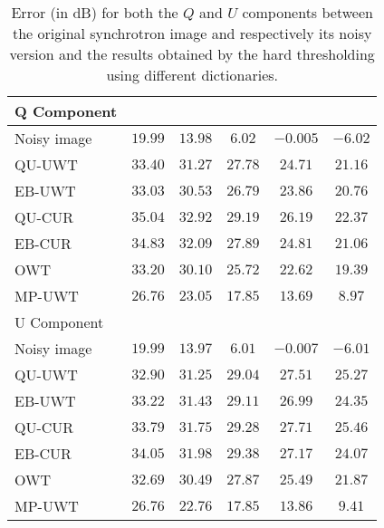 \begin{table}
\caption{ Error (in dB) for both the $Q$ and $U$ components between the original synchrotron image and  respectively 
its noisy version and the results obtained by the hard thresholding using different dictionaries.}
\begin{tabular}{l|ccccc}\hline
Q Component   &                    &  &  & &  \\      \hline
   Noisy image   & $19.99$    &   $13.98$   &   $6.02$     &   $-0.005$   &   $-6.02$   \\      \hline \hline
QU-UWT            &  $33.40$   &   $31.27$   &   $27.78$   &   $24.71$    &   $21.16$ \\
EB-UWT            &   $33.03$   &  $30.53$   &   $26.79$   &  $23.86$     &   $20.76$   \\
QU-CUR           &   $35.04$   &  $32.92$     &    $29.19$   &  $26.19$  &    $22.37$   \\
EB-CUR           &    $34.83$   &  $32.09$   &    $27.89$   &  $24.81$    &   $ 21.06$    \\   
OWT                   &   $33.20$    & $30.10$   &    $ 25.72$   &   $22.62$   &    $19.39$     \\    
MP-UWT     &    $26.76$    & $23.05$  &     $17.85$   &    $13.69$  &   $8.97$  \\  \hline
U Component  &                 &  &  & &                \\      \hline
Noisy image    & $19.99$    &   $13.97$   &   $6.01$     &   $-0.007$      &   $-6.01$   \\      \hline  \hline
QU-UWT           &   $32.90$   &   $31.25$   &   $29.04$   &   $27.51$     &   $25.27$ \\
EB-UWT            &   $33.22$   &  $31.43$   &   $29.11$   &  $26.99$       &   $24.35$  \\
QU-CUR           &   $33.79$   &  $ 31.75$     &    $29.28$   &  $27.71$    & $25.46$     \\
EB-CUR            &    $34.05$   &  $ 31.98$   &    $29.38$   &  $27.17$    &  $24.07$    \\     
OWT                   &   $32.69$    &    $30.49$   &   $27.87$   & $25.49$ &    $21.87$   \\ 
MP-UWT     &    $26.76$    &   $22.76$   & $17.85$  &     $13.86$   &    $ 9.41$   \\  \hline
\hline
\end{tabular}\label{tab_psnr_pol_sync}
\end{table}

